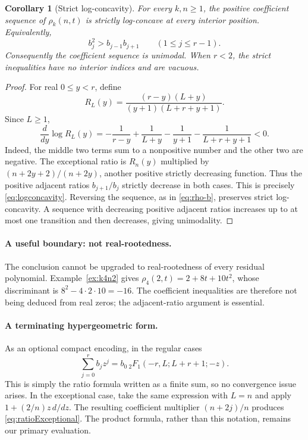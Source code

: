\documentclass[11pt,letterpaper]{article}
\numberwithin{equation}{section}
\newtheorem{corollary}[theorem]{Corollary}
\theoremstyle{definition}
\begin{document}
\begin{corollary}[Strict log-concavity]\label{cor:logconcavity}
For every \(k,n\ge1\), the positive coefficient sequence of
\(\rho_k(n,t)\) is strictly log-concave at every interior position.
Equivalently,
\begin{equation}\label{eq:logconcavity}
 b_j^2>b_{j-1}b_{j+1}\qquad(1\le j\le r-1).
\end{equation}
Consequently the coefficient sequence is unimodal. When \(r<2\), the
strict inequalities have no interior indices and are vacuous.
\end{corollary}
\begin{proof}
For real \(0\le y<r\), define
\[
 R_L(y)=\frac{(r-y)(L+y)}{(y+1)(L+r+y+1)}.
\]
Since \(L\ge1\),
\[
 \frac{d}{dy}\log R_L(y)
 =-\frac1{r-y}+\frac1{L+y}-\frac1{y+1}
  -\frac1{L+r+y+1}<0.
\]
Indeed, the middle two terms sum to a nonpositive number and the other
two are negative. The exceptional ratio is \(R_n(y)\) multiplied by
\((n+2y+2)/(n+2y)\), another positive strictly decreasing function.
Thus the positive adjacent ratios \(b_{j+1}/b_j\) strictly decrease
in both cases. This is precisely \eqref{eq:logconcavity}. Reversing the
sequence, as in \eqref{eq:rho-b}, preserves strict log-concavity.
A sequence with decreasing positive adjacent ratios increases up to at
most one transition and then decreases, giving unimodality.
\end{proof}

\paragraph{A useful boundary: not real-rootedness.}
The conclusion cannot be upgraded to real-rootedness of every residual
polynomial. Example~\ref{ex:k4n2} gives
\(\rho_4(2,t)=2+8t+10t^2\), whose discriminant is
\(8^2-4\cdot2\cdot10=-16\). The coefficient inequalities are therefore
not being deduced from real zeros; the adjacent-ratio argument is essential.

\paragraph{A terminating hypergeometric form.}
As an optional compact encoding, in the regular cases
\[
 \sum_{j=0}^r b_jz^j
 =b_0\,{}_2F_1(-r,L;L+r+1;-z).
\]
This is simply the ratio formula written as a finite sum, so no convergence
issue arises. In the exceptional case, take the same expression with
\(L=n\) and apply \(1+(2/n)z\,d/dz\). The resulting coefficient
multiplier \((n+2j)/n\) produces \eqref{eq:ratioExceptional}.
The product formula, rather than this notation, remains our primary
evaluation.
\end{document}
